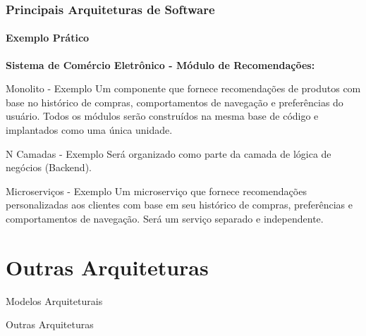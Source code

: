 \documentclass[
	10pt, %
	t, %
]{beamer}
\begin{document}
\begin{frame}
	\frametitle{Principais Arquiteturas de Software}
	\framesubtitle{Exemplo Prático}

	\textbf{Sistema de Comércio Eletrônico - Módulo de Recomendações:}

	\begin{exampleblock}{Monolito - Exemplo}
		Um componente que fornece recomendações de produtos com base no histórico de compras, comportamentos de navegação e preferências do usuário. Todos os módulos serão construídos na mesma base de código e implantados como uma única unidade.
	\end{exampleblock}

	\begin{exampleblock}{N Camadas - Exemplo}
		Será organizado como parte da camada de lógica de negócios (Backend).
	\end{exampleblock}

	\begin{exampleblock}{Microserviços - Exemplo}
		Um microserviço que fornece recomendações personalizadas aos clientes com base em seu histórico de compras, preferências e comportamentos de navegação. Será um serviço separado e independente.
	\end{exampleblock}
	

\end{frame}

\section{Outras Arquiteturas}

\begin{frame}
	\begin{center}
		
		\bigskip\bigskip\bigskip\bigskip %
		{\Large Modelos Arquiteturais}
		
		\bigskip\bigskip %
		{\Huge Outras Arquiteturas}
		
	\end{center}

\end{frame}
\end{document}
